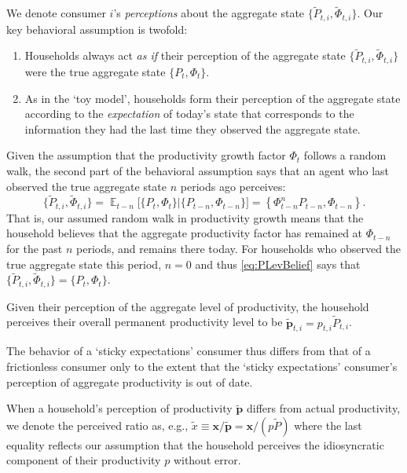 \documentclass[titlepage]{article}
\DeclareMathOperator{\Ex}{\mathbb{E}} %
\begin{document}
We denote consumer $i$'s \textit{perceptions} about the aggregate state $\{\widetilde{P}_{t,i},\widetilde{\Phi}_{t,i}\}$.  Our key behavioral assumption is twofold:
\begin{enumerate}
\item Households always act \textit{as if} their perception of the aggregate state $\{\widetilde{P}_{t,i},\widetilde{\Phi}_{t,i}\}$ were the true aggregate state $\{P_t,\Phi_t\}$.

\item As in the `toy model', households form their perception of the aggregate state according to the \textit{expectation} of today's state that corresponds to the information they had the last time they observed the aggregate state.
\end{enumerate}
Given the assumption that the productivity growth factor $\Phi_t$ follows a random walk,
the second part of the behavioral assumption says that an agent who last observed the true
aggregate state $n$ periods ago perceives:
\begin{equation}\label{eq:PLevBelief}
\{\widetilde{P}_{t,i},\widetilde{\Phi}_{t,i}\} = \Ex_{t-n}\big[\{P_t,\Phi_t\} \big| \{P_{t-n},\Phi_{t-n}\}\big] = \left\{\Phi_{t-n}^{n} P_{t-n},\Phi_{t-n}\right\}.
\end{equation}
That is, our assumed random walk in productivity growth means that the household believes that the aggregate productivity factor has remained at $\Phi_{t-n}$ for the past $n$ periods, and remains there today. For households who observed the true aggregate state this period, $n=0$ and thus \eqref{eq:PLevBelief} says that $\{\widetilde{P}_{t,i},\widetilde{\Phi}_{t,i}\} = \{P_t,\Phi_t\}$.

Given their perception of the aggregate level of productivity, the household perceives their overall permanent productivity level to be $\widetilde{\pmb{p}}_{t,i} = p_{t,i} \widetilde{P}_{t,i}$.

The behavior of a `sticky expectations' consumer thus differs from that of a frictionless consumer only to the extent that the `sticky expectations' consumer's perception of aggregate productivity is out of date.

When a household's perception of productivity $\widetilde{\pmb{p}}$ differs from actual productivity, we denote the perceived ratio as, e.g., $\widetilde{x} \equiv \mathbf{x}/\widetilde{\pmb{p}} = \mathbf{x}/({p}\widetilde{P})$ where the last equality reflects our assumption that the household perceives the idiosyncratic component of their productivity ${p}$ without error.
\end{document}
